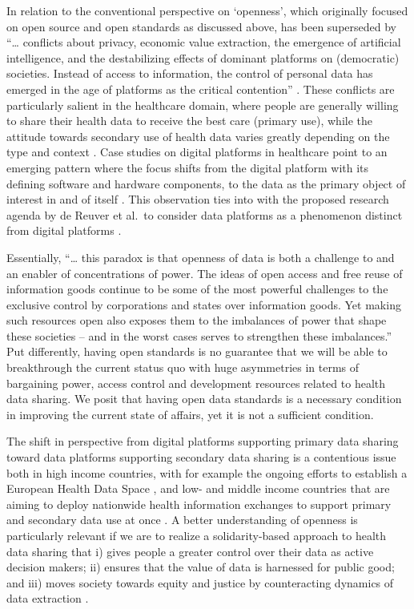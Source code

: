 \documentclass[
  authoryear]{elsarticle}
\begin{document}
In relation to the conventional perspective on `openness', which
originally focused on open source and open standards as discussed above,
has been superseded by ``\ldots{} conflicts about privacy, economic
value extraction, the emergence of artificial intelligence, and the
destabilizing effects of dominant platforms on (democratic) societies.
Instead of access to information, the control of personal data has
emerged in the age of platforms as the critical contention''
\citep{keller2021paradox}. These conflicts are particularly salient in
the healthcare domain, where people are generally willing to share their
health data to receive the best care (primary use), while the attitude
towards secondary use of health data varies greatly depending on the
type and context . Case studies on digital platforms in healthcare point
to an emerging pattern where the focus shifts from the digital platform
with its defining software and hardware components, to the data as the
primary object of interest in and of itself
\citep{ozalp2022digital, alaimo2022organizations}. This observation ties
into with the proposed research agenda by de Reuver et al.~to consider
data platforms as a phenomenon distinct from digital platforms
\citep{dereuver2018digital, dereuver2022openness}.

Essentially, ``\ldots{} this paradox is that openness of data is both a
challenge to and an enabler of concentrations of power. The ideas of
open access and free reuse of information goods continue to be some of
the most powerful challenges to the exclusive control by corporations
and states over information goods. Yet making such resources open also
exposes them to the imbalances of power that shape these societies --
and in the worst cases serves to strengthen these imbalances.'' Put
differently, having open standards is no guarantee that we will be able
to breakthrough the current status quo with huge asymmetries in terms of
bargaining power, access control and development resources related to
health data sharing. We posit that having open data standards is a
necessary condition in improving the current state of affairs, yet it is
not a sufficient condition.

The shift in perspective from digital platforms supporting primary data
sharing toward data platforms supporting secondary data sharing is a
contentious issue both in high income countries, with for example the
ongoing efforts to establish a European Health Data Space
\citep{otto2022designing}, and low- and middle income countries that are
aiming to deploy nationwide health information exchanges to support
primary and secondary data use at once \citep{mamuye2022health}. A
better understanding of openness is particularly relevant if we are to
realize a solidarity-based approach to health data sharing that i) gives
people a greater control over their data as active decision makers; ii)
ensures that the value of data is harnessed for public good; and iii)
moves society towards equity and justice by counteracting dynamics of
data extraction
\citep{kickbusch2021lancet, prainsack2022data, prainsack2023beyond}.
\end{document}
